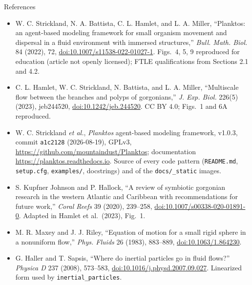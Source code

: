\documentclass[aspectratio=169,11pt]{beamer}
\begin{document}
\begin{frame}{References}
\footnotesize
\begin{itemize}\itemsep3pt
  \item W. C. Strickland, N. A. Battista, C. L. Hamlet, and L. A. Miller, ``Planktos: an agent-based modeling framework for small organism movement and dispersal in a fluid environment with immersed structures,'' \emph{Bull. Math. Biol.} 84 (2022), 72, \href{https://doi.org/10.1007/s11538-022-01027-1}{doi:10.1007/s11538-022-01027-1}. Figs.~4, 5, 9 reproduced for education (article not openly licensed); FTLE qualifications from Sections 2.1 and 4.2.
  \item C. L. Hamlet, W. C. Strickland, N. Battista, and L. A. Miller, ``Multiscale flow between the branches and polyps of gorgonians,'' \emph{J. Exp. Biol.} 226(5) (2023), jeb244520, \href{https://doi.org/10.1242/jeb.244520}{doi:10.1242/jeb.244520}. CC BY 4.0; Figs.~1 and 6A reproduced.
  \item W. C. Strickland \emph{et al.}, \emph{Planktos} agent-based modeling framework, v1.0.3, commit \texttt{a1c2128} (2026-08-19), GPLv3, \url{https://github.com/mountaindust/Planktos}; documentation \url{https://planktos.readthedocs.io}. Source of every code pattern (\texttt{README.md}, \texttt{setup.cfg}, \texttt{examples/}, docstrings) and of the \texttt{docs/\_static} images.
  \item S. Kupfner Johnson and P. Hallock, ``A review of symbiotic gorgonian research in the western Atlantic and Caribbean with recommendations for future work,'' \emph{Coral Reefs} 39 (2020), 239--258, \href{https://doi.org/10.1007/s00338-020-01891-0}{doi:10.1007/s00338-020-01891-0}. Adapted in Hamlet et al.\ (2023), Fig.~1.
  \item M. R. Maxey and J. J. Riley, ``Equation of motion for a small rigid sphere in a nonuniform flow,'' \emph{Phys. Fluids} 26 (1983), 883--889, \href{https://doi.org/10.1063/1.864230}{doi:10.1063/1.864230}.
  \item G. Haller and T. Sapsis, ``Where do inertial particles go in fluid flows?'' \emph{Physica D} 237 (2008), 573--583, \href{https://doi.org/10.1016/j.physd.2007.09.027}{doi:10.1016/j.physd.2007.09.027}. Linearized form used by \texttt{inertial\_particles}.
\end{itemize}
\end{frame}
\end{document}
